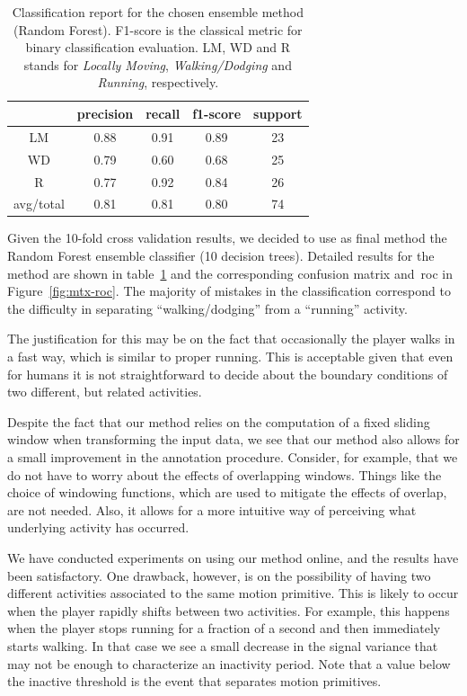 \begin{table}[h]\footnotesize
  \centering
  \caption{Classification report for the chosen ensemble method (Random Forest). F1-score is the classical metric for binary classification evaluation. LM, WD and R stands for \textit{Locally Moving}, \textit{Walking/Dodging} and \textit{Running}, respectively. %
  }
  \begin{tabular}{| c | c | c | c | c |}
    \hline
  	   & precision   & recall & f1-score &  support \\\hline
    LM &      0.88   &  0.91  &    0.89  &      23  \\\hline
    WD &      0.79   &  0.60 &     0.68 &       25  \\\hline
     R &      0.77   &  0.92 &     0.84 &       26  \\\hline
avg/total &   0.81   &  0.81 &     0.80 &       74  \\\hline
  \end{tabular}
  \label{report}
\end{table}

Given the 10-fold cross validation results, we decided to use as final method the Random Forest ensemble classifier (10 decision trees). Detailed results for the method are shown in table~\ref{report} and the corresponding confusion matrix and~\gls{roc} in Figure~\ref{fig:mtx-roc}. The majority of mistakes in the classification correspond to the difficulty in separating ``walking/dodging'' from  a ``running'' activity. 

The justification for this may be on the fact that occasionally the player walks in a fast way, which is similar to proper running. This is acceptable given that even for humans it is not straightforward to decide about the boundary conditions of two different, but related activities.

Despite the fact that our method relies on the computation of a fixed sliding window when transforming the input data, we see that our method also allows for a small improvement in the annotation procedure. Consider, for example, that we do not have to worry about the effects of overlapping windows. Things like the choice of windowing functions, which are used to mitigate the effects of overlap, are not needed. Also, it allows for a more intuitive way of perceiving what underlying activity has occurred.

We have conducted experiments on using our method online, and the results have been satisfactory. One drawback, however, is on the possibility of having two different activities associated to the same motion primitive. This is likely to occur when the player rapidly shifts between two activities. For example, this happens when the player stops running for a fraction of a second and then immediately starts walking. In that case we see a small decrease in the signal variance that may not be enough to characterize an inactivity period. Note that a value below the inactive threshold is the event that separates motion primitives.

